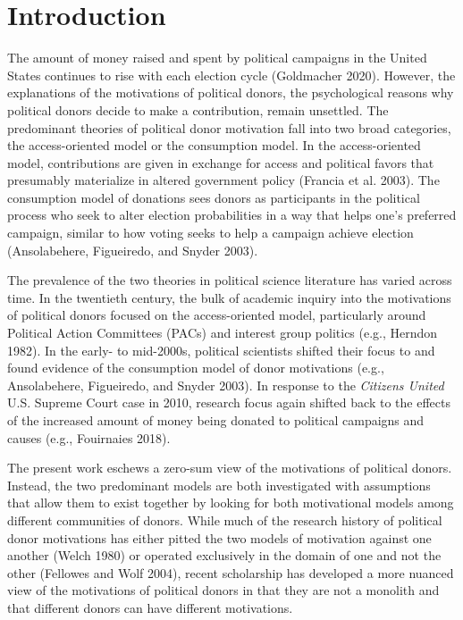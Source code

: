 \documentclass[12pt,]{article}
\begin{document}
\vskip -8.5pt



\noindent \doublespacing 

\hypertarget{introduction}{%
\section{Introduction}\label{introduction}}

The amount of money raised and spent by political campaigns in the
United States continues to rise with each election cycle (Goldmacher
2020). However, the explanations of the motivations of political donors,
the psychological reasons why political donors decide to make a
contribution, remain unsettled. The predominant theories of political
donor motivation fall into two broad categories, the access-oriented
model or the consumption model. In the access-oriented model,
contributions are given in exchange for access and political favors that
presumably materialize in altered government policy (Francia et al.
2003). The consumption model of donations sees donors as participants in
the political process who seek to alter election probabilities in a way
that helps one's preferred campaign, similar to how voting seeks to help
a campaign achieve election (Ansolabehere, Figueiredo, and Snyder 2003).

The prevalence of the two theories in political science literature has
varied across time. In the twentieth century, the bulk of academic
inquiry into the motivations of political donors focused on the
access-oriented model, particularly around Political Action Committees
(PACs) and interest group politics (e.g., Herndon 1982). In the early-
to mid-2000s, political scientists shifted their focus to and found
evidence of the consumption model of donor motivations (e.g.,
Ansolabehere, Figueiredo, and Snyder 2003). In response to the
\emph{Citizens United} U.S. Supreme Court case in 2010, research focus
again shifted back to the effects of the increased amount of money being
donated to political campaigns and causes (e.g., Fouirnaies 2018).

The present work eschews a zero-sum view of the motivations of political
donors. Instead, the two predominant models are both investigated with
assumptions that allow them to exist together by looking for both
motivational models among different communities of donors. While much of
the research history of political donor motivations has either pitted
the two models of motivation against one another (Welch 1980) or
operated exclusively in the domain of one and not the other (Fellowes
and Wolf 2004), recent scholarship has developed a more nuanced view of
the motivations of political donors in that they are not a monolith and
that different donors can have different motivations.
\end{document}
